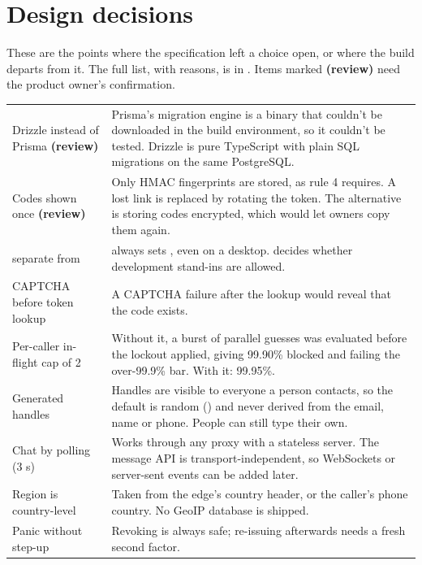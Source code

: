 \chapter{Design decisions}
\label{app:decisions}

These are the points where the specification left a choice open, or where the build departs from it. The full list, with reasons, is in . Items marked \textbf{(review)} need the product owner's confirmation.

\begin{longtable}{@{}L{4.4cm}p{10.8cm}@{}}
\toprule
{} &  \\
\midrule\endhead
Drizzle instead of Prisma \textbf{(review)} & Prisma's migration engine is a binary that couldn't be downloaded in the build environment, so it couldn't be tested. Drizzle is pure TypeScript with plain SQL migrations on the same PostgreSQL. \\
Codes shown once \textbf{(review)} & Only HMAC fingerprints are stored, as rule 4 requires. A lost link is replaced by rotating the token. The alternative is storing codes encrypted, which would let owners copy them again. \\
 separate from  &  always sets , even on a desktop.  decides whether development stand-ins are allowed. \\
CAPTCHA before token lookup & A CAPTCHA failure after the lookup would reveal that the code exists. \\
Per-caller in-flight cap of 2 & Without it, a burst of parallel guesses was evaluated before the lockout applied, giving 99.90\% blocked and failing the over-99.9\% bar. With it: 99.95\%. \\
Generated handles & Handles are visible to everyone a person contacts, so the default is random () and never derived from the email, name or phone. People can still type their own. \\
Chat by polling (3 s) & Works through any proxy with a stateless server. The message API is transport-independent, so WebSockets or server-sent events can be added later. \\
Region is country-level & Taken from the edge's country header, or the caller's phone country. No GeoIP database is shipped. \\
Panic without step-up & Revoking is always safe; re-issuing afterwards needs a fresh second factor. \\

\end{longtable}
